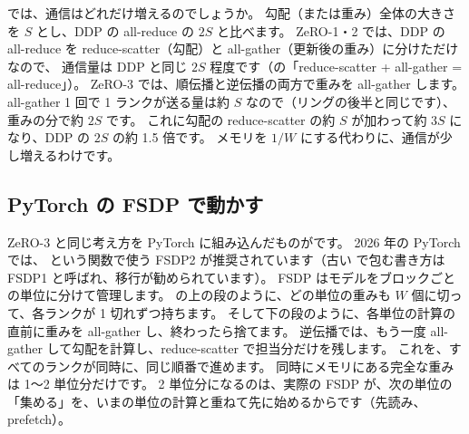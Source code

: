では、通信はどれだけ増えるのでしょうか。
勾配（または重み）全体の大きさを $S$ とし、DDP の all-reduce の $2S$ と比べます。
ZeRO-1・2 では、DDP の all-reduce を reduce-scatter（勾配）と all-gather（更新後の重み）に分けただけなので、
通信量は DDP と同じ $2S$ 程度です（の「reduce-scatter + all-gather = all-reduce」）。
ZeRO-3 では、順伝播と逆伝播の両方で重みを all-gather します。
all-gather 1 回で 1 ランクが送る量は約 $S$ なので（リングの後半と同じです）、重みの分で約 $2S$ です。
これに勾配の reduce-scatter の約 $S$ が加わって約 $3S$ になり、DDP の $2S$ の約 1.5 倍です\cite{rajbhandari2020zero}。
メモリを $1/W$ にする代わりに、通信が少し増えるわけです。

\subsection*{PyTorch の FSDP で動かす}

ZeRO-3 と同じ考え方を PyTorch に組み込んだものがです\cite{zhao2023pytorch}。
2026 年の PyTorch では、 という関数で使う FSDP2 が推奨されています（古い  で包む書き方は FSDP1 と呼ばれ、移行が勧められています）。
FSDP はモデルをブロックごとの単位に分けて管理します。
の上の段のように、どの単位の重みも $W$ 個に切って、各ランクが 1 切れずつ持ちます。
そして下の段のように、各単位の計算の直前に重みを all-gather し、終わったら捨てます。
逆伝播では、もう一度 all-gather して勾配を計算し、reduce-scatter で担当分だけを残します。
これを、すべてのランクが同時に、同じ順番で進めます。
同時にメモリにある完全な重みは 1〜2 単位分だけです。
2 単位分になるのは、実際の FSDP が、次の単位の「集める」を、いまの単位の計算と重ねて先に始めるからです（先読み、prefetch）。

